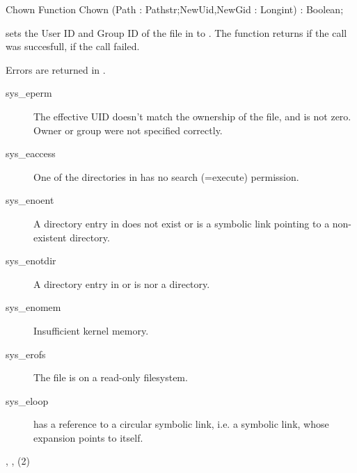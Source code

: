 \begin{function}{Chown}
\Declaration
Function Chown (Path : Pathstr;NewUid,NewGid : Longint) : Boolean;

\Description
  sets the User ID and Group ID of the file in  to .
The function returns  if the call was succesfull,  if the call
failed.

\Errors

Errors are returned in .
\begin{description}
\item[sys\_eperm] The effective UID doesn't match the ownership of the file,
and is not zero. Owner or group were not specified correctly.
\item[sys\_eaccess] One of the directories in  has no
search (=execute) permission.
\item[sys\_enoent] A directory entry in  does
not exist or is a symbolic link pointing to a non-existent directory.
\item[sys\_enotdir] A directory entry in  or  is
nor a directory.
\item[sys\_enomem] Insufficient kernel memory.
\item[sys\_erofs] The file is on a read-only filesystem.
\item[sys\_eloop]  has a reference to a circular
symbolic link, i.e. a symbolic link, whose expansion points to itself.
\end{description}

\SeeAlso
{}, , (2)
\end{function}
\html{}
